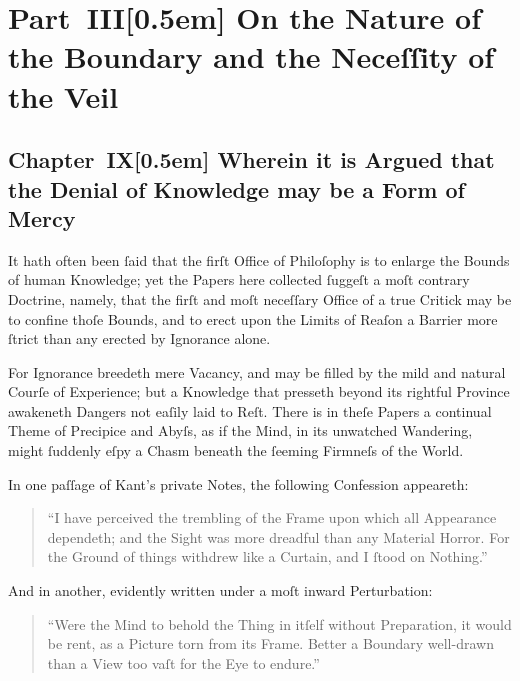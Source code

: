 \documentclass[12pt]{book}
\begin{document}
\newpage
\part*{Part~III[0.5em]
On the Nature of the Boundary and the Neceſſity of the Veil}



\chapter*{Chapter~IX[0.5em]
Wherein it is Argued that the Denial of Knowledge may be a Form of Mercy}


It hath often been ſaid that the firſt Office of Philoſophy is to enlarge the Bounds of human Knowledge; yet the Papers here collected ſuggeſt a moſt contrary Doctrine, namely, that the firſt and moſt neceſſary Office of a true Critick may be to confine thoſe Bounds, and to erect upon the Limits of Reaſon a Barrier more ſtrict than any erected by Ignorance alone.

For Ignorance breedeth mere Vacancy, and may be filled by the mild and natural Courſe of Experience; but a Knowledge that presseth beyond its rightful Province awakeneth Dangers not eaſily laid to Reſt. There is in theſe Papers a continual Theme of Precipice and Abyſs, as if the Mind, in its unwatched Wandering, might ſuddenly eſpy a Chasm beneath the ſeeming Firmneſs of the World.

In one paſſage of Kant’s private Notes, the following Confession appeareth:

\begin{quote}
``I have perceived the trembling of the Frame upon which all Appearance dependeth; and the Sight was more dreadful than any Material Horror. For the Ground of things withdrew like a Curtain, and I ſtood on Nothing.''
\end{quote}

And in another, evidently written under a moſt inward Perturbation:

\begin{quote}
``Were the Mind to behold the Thing in itſelf without Preparation, it would be rent, as a Picture torn from its Frame. Better a Boundary well-drawn than a View too vaſt for the Eye to endure.''
\end{quote}
\end{document}
